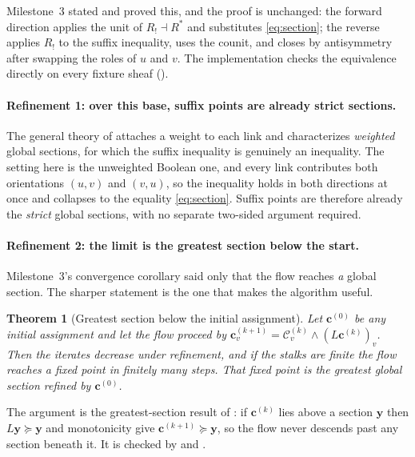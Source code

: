 \documentclass[11pt]{article}
\renewcommand{\succeq}{\succcurlyeq}
\newcommand{\meet}{\wedge}
\newtheorem{theorem}{Theorem}
\theoremstyle{definition}
\theoremstyle{remark}
\begin{document}
Milestone~3 stated and proved this, and the proof is unchanged: the forward direction applies
the unit of $R_! \dashv R^{*}$ and substitutes \eqref{eq:section}; the reverse applies $R_!$ to
the suffix inequality, uses the counit, and closes by antisymmetry after swapping the roles of
$u$ and $v$.
The implementation checks the equivalence directly on every fixture sheaf
().

\paragraph{Refinement 1: over this base, suffix points are already strict sections.}
The general theory of \citet{ghristCategoricalDiffusionWeighted2026} attaches a weight to each
link and characterizes \emph{weighted} global sections, for which the suffix inequality is
genuinely an inequality.
The setting here is the unweighted Boolean one, and every link contributes both orientations
$(u,v)$ and $(v,u)$, so the inequality holds in both directions at once and collapses to the
equality \eqref{eq:section}.
Suffix points are therefore already the \emph{strict} global sections, with no separate
two-sided argument required.

\paragraph{Refinement 2: the limit is the greatest section below the start.}
Milestone~3's convergence corollary said only that the flow reaches \emph{a} global section.
The sharper statement is the one that makes the algorithm useful.

\begin{theorem}[Greatest section below the initial assignment]
\label{thm:greatest}
Let $\mathbf{c}^{(0)}$ be any initial assignment and let the flow proceed by
$\mathbf{c}^{(k+1)}_v = \mathcal{C}^{(k)}_v \meet (L\mathbf{c}^{(k)})_v$.
Then the iterates decrease under refinement, and if the stalks are finite the flow reaches a
fixed point in finitely many steps.
That fixed point is the \emph{greatest} global section refined by $\mathbf{c}^{(0)}$.
\end{theorem}

The argument is the greatest-section result of \citet{ghristCategoricalDiffusionWeighted2026}: if
$\mathbf{c}^{(k)}$ lies above a section $\mathbf{y}$ then $L\mathbf{y} \succeq \mathbf{y}$ and
monotonicity give $\mathbf{c}^{(k+1)} \succeq \mathbf{y}$, so the flow never descends past any
section beneath it.
It is checked by  and
.
\end{document}
